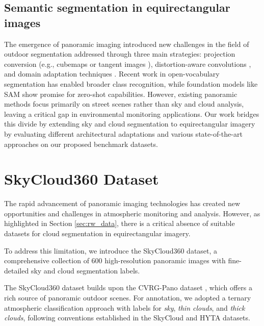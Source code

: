 \documentclass[conference]{IEEEtran}
\begin{document}
\subsection{Semantic segmentation in equirectangular images}

The emergence of panoramic imaging introduced new challenges in the field of outdoor segmentation addressed through three main strategies: projection conversion (e.g., cubemaps \cite{gerhardt2020neural, eder2019convolutions, may2023cubegan} or tangent images \cite{li2022omnifusion, yang2020omnisupervised, eder2020tangent}), distortion-aware convolutions \cite{tateno2018distortion, orhan2022semantic}, and domain adaptation techniques \cite{zhang2022behind, tian2024self, liu2021source, zheng2024semantics, zheng2023both}. 
Recent work in open-vocabulary segmentation \cite{zheng2024open} has enabled broader class recognition, while foundation models like SAM \cite{kirillov2023segment} show promise for zero-shot capabilities. 
However, existing panoramic methods focus primarily on street scenes rather than sky and cloud analysis, leaving a critical gap in environmental monitoring applications. 
Our work bridges this divide by extending sky and cloud segmentation to equirectangular imagery by evaluating different architectural adaptations and various state-of-the-art approaches on our proposed benchmark datasets.

\section{SkyCloud360 Dataset\label{sec:data_set}}

The rapid advancement of panoramic imaging technologies has created new opportunities and challenges in atmospheric monitoring and analysis. 
However, as highlighted in Section \ref{sec:rw_data}, there is a critical absence of suitable datasets for cloud segmentation in equirectangular imagery.

To address this limitation, we introduce the SkyCloud360 dataset, a comprehensive collection of 600 high-resolution panoramic images with fine-detailed sky and cloud segmentation labels. 

The SkyCloud360 dataset builds upon the CVRG-Pano dataset \cite{orhan2022semantic}, which offers a rich source of panoramic outdoor scenes. 
For annotation, we adopted a ternary atmospheric classification approach with labels for \textit{sky}, \textit{thin clouds}, and \textit{thick clouds}, following conventions established in the SkyCloud \cite{gerhardt2023skycloud} and HYTA \cite{hyta2} datasets.
\end{document}
